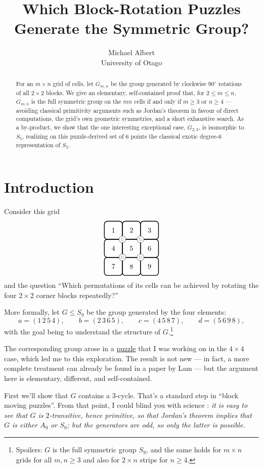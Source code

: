 \documentclass[11pt]{article}
\title{Which Block-Rotation Puzzles Generate the Symmetric Group?}
\author{Michael Albert \\ University of Otago}
\date{}
\newcommand{\SetupGrid}{%
  \begin{tikzpicture}[baseline=(current bounding box.center)]
    \def\tileSize{9mm}
    \def\tileGap{3mm}
    \def\step{\tileSize+\tileGap}
    \foreach \i in {1,...,9} {
      \pgfmathtruncatemacro{\r}{int((\i-1)/3)}
      \pgfmathtruncatemacro{\c}{mod(\i-1,3)}
      \node[rectangle, rounded corners=1.5mm, draw=black, line width=1pt,
            minimum width=\tileSize, minimum height=\tileSize,
            font=\normalsize] at (\c*\step,-\r*\step) {\i};
    }
    \foreach \r in {0,1} {
      \foreach \c in {0,1} {
        \node[circle, draw=black, fill=white, inner sep=0pt, minimum size=3.4mm]
          at ({(\c+0.5)*\step},{-(\r+0.5)*\step}) {\tiny$\circlearrowright$};
      }
    }
  \end{tikzpicture}%
}
\begin{document}
\maketitle

\begin{abstract}
For an $m\times n$ grid of cells, let $G_{m,n}$ be the group generated by clockwise $90^\circ$ rotations of all $2\times2$ blocks. We give an elementary, self-contained proof that, for $2 \le m \le n$, $G_{m,n}$ is the full symmetric group on the $mn$ cells if and only if $m \ge 3$ or $n \ge 4$ — avoiding classical primitivity arguments such as Jordan's theorem in favour of direct computations, the grid's own geometric symmetries, and a short exhaustive search. As a by-product, we show that the one interesting exceptional case, $G_{2,3}$, is isomorphic to $S_5$, realizing on this puzzle-derived set of $6$ points the classical exotic degree-$6$ representation of $S_5$.
\end{abstract}

\section{Introduction}

Consider this grid
\[
\SetupGrid
\]
and the question ``Which permutations of its cells can be achieved by rotating the four $2\times2$ corner blocks repeatedly?'' 

More formally, let $G \le S_9$ be the group generated by the four elements:
\[
a = (1\,2\,5\,4), \qquad b = (2\,3\,6\,5), \qquad c = (4\,5\,8\,7), \qquad d = (5\,6\,9\,8),
\]
with the goal being to understand the structure of $G$.\footnote{Spoilers: $G$ is the full symmetric group $S_9$, and the same holds for $m\times n$ grids for all $m,n \ge 3$ and also for $2\times n$ strips for $n \ge 4$.}

The corresponding group arose in a \href{https://michael-albert-dun.github.io/tintangle}{puzzle} that I was working on in the $4\times4$ case, which led me to this exploration. The result is not new — in fact, a more complete treatment can already be found in a paper by Lam \cite{Lam2022} — but the argument here is elementary, different, and self-contained.

First we'll show that $G$ contains a $3$-cycle. That's a standard step in ``block moving puzzles''. From that point, I could blind you with science \cite{Dolby1982}: \emph{it is easy to see that $G$ is $2$-transitive, hence primitive, so that Jordan's theorem \cite{DixonMortimer1996, Jordan1873} implies that $G$ is either $A_9$ or $S_9$; but the generators are odd, so only the latter is possible.}
\end{document}
